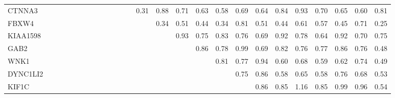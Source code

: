 \begin{longtable}{lrrrrrrrrrrrrrrrrrrrrrrrrr}
CTNNA3   &              &            &            &            &            &             &               &            &             &              &             &              &        0.31 &           0.88 &       0.71 &       0.63 &           0.58 &        0.69 &          0.64 &        0.84 &      0.93 &           0.70 &        0.65 &        0.60 &          0.81 \\
FBXW4    &              &            &            &            &            &             &               &            &             &              &             &              &             &           0.34 &       0.51 &       0.44 &           0.34 &        0.81 &          0.51 &        0.44 &      0.61 &           0.57 &        0.45 &        0.71 &          0.25 \\
KIAA1598 &              &            &            &            &            &             &               &            &             &              &             &              &             &                &       0.93 &       0.75 &           0.83 &        0.76 &          0.69 &        0.92 &      0.78 &           0.64 &        0.92 &        0.70 &          0.75 \\
GAB2     &              &            &            &            &            &             &               &            &             &              &             &              &             &                &            &       0.86 &           0.78 &        0.99 &          0.69 &        0.82 &      0.76 &           0.77 &        0.86 &        0.76 &          0.48 \\
WNK1     &              &            &            &            &            &             &               &            &             &              &             &              &             &                &            &            &           0.81 &        0.77 &          0.94 &        0.60 &      0.68 &           0.59 &        0.62 &        0.74 &          0.49 \\
DYNC1LI2 &              &            &            &            &            &             &               &            &             &              &             &              &             &                &            &            &                &        0.75 &          0.86 &        0.58 &      0.65 &           0.58 &        0.76 &        0.68 &          0.53 \\
KIF1C    &              &            &            &            &            &             &               &            &             &              &             &              &             &                &            &            &                &             &          0.86 &        0.85 &      1.16 &           0.85 &        0.99 &        0.96 &          0.54 \\

\end{longtable}
